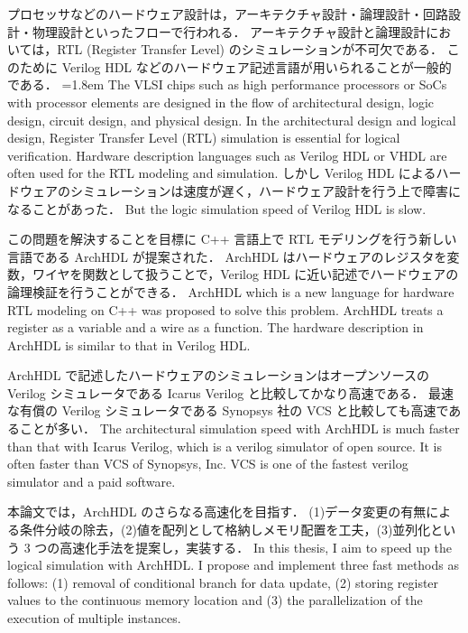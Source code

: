 プロセッサなどのハードウェア設計は，アーキテクチャ設計・論理設計・回路設計・物理設計といったフローで行われる．
アーキテクチャ設計と論理設計においては，RTL (Register Transfer Level) のシミュレーションが不可欠である．
このために Verilog HDL などのハードウェア記述言語が用いられることが一般的である．
\fi
\parindent=1.8em
The VLSI chips such as high performance processors or SoCs with processor elements are designed in the flow of architectural design,
logic design, circuit design, and physical design.
In the architectural design and logical design, Register Transfer Level (RTL) simulation is essential for logical verification.
Hardware description languages such as Verilog HDL or VHDL are often used for the RTL modeling and simulation.
しかし Verilog HDL によるハードウェアのシミュレーションは速度が遅く，ハードウェア設計を行う上で障害になることがあった．
\fi
But the logic simulation speed of Verilog HDL is slow.

この問題を解決することを目標に C++ 言語上で RTL モデリングを行う新しい言語である ArchHDL が提案された．
ArchHDL はハードウェアのレジスタを変数，ワイヤを関数として扱うことで，Verilog HDL に近い記述でハードウェアの論理検証を行うことができる．
\fi
ArchHDL which is a new language for hardware RTL modeling on C++ was proposed to solve this problem.
ArchHDL treats a register as a variable and a wire as a function.
The hardware description in ArchHDL is similar to that in Verilog HDL.

ArchHDL で記述したハードウェアのシミュレーションはオープンソースの Verilog シミュレータである Icarus Verilog と比較してかなり高速である．
最速な有償の Verilog シミュレータである Synopsys 社の VCS と比較しても高速であることが多い．
\fi
The architectural simulation speed with ArchHDL is much faster than
that with Icarus Verilog, which is a verilog simulator of open source.
It is often faster than VCS of Synopsys, Inc.
VCS is one of the fastest verilog simulator and a paid software.

本論文では，ArchHDL のさらなる高速化を目指す．
(1)データ変更の有無による条件分岐の除去，(2)値を配列として格納しメモリ配置を工夫，(3)並列化という 3 つの高速化手法を提案し，実装する．
\fi
In this thesis, I aim to speed up the logical simulation with ArchHDL.
I propose and implement three fast methods as follows:
(1) removal of conditional branch for data update,
(2) storing register values to the continuous memory location
and (3) the parallelization of the execution of multiple instances.

